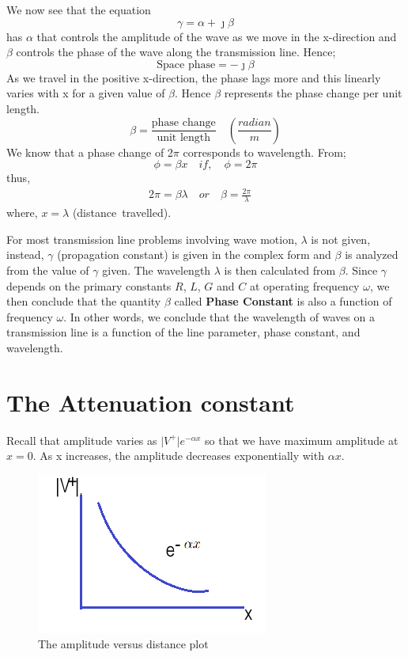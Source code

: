 We now see that the equation 
\begin{equation}
\gamma = \alpha + \jmath\beta 
\end{equation}
has $\alpha$ that controls the amplitude of the wave as we move in the x-direction and $\beta$ controls the phase of the wave along the transmission line. Hence;
\begin{equation}
\text{Space phase} = -\jmath\beta
\end{equation}
As we travel in the positive x-direction, the phase lags more and this linearly varies with x for a given value of $\beta$. Hence $\beta$ represents the phase change per unit length.
\begin{equation}
\beta = \frac{\text{phase change}}{\text{unit length}} \quad\left(\frac{radian}{m}\right)
\end{equation}
We know that a phase change of 2$\pi$ corresponds to wavelength. From;
\begin{equation}
\phi = \beta x \quad if,  \quad\phi = 2\pi
\end{equation}
thus,
\begin{align*}
2\pi = \beta\lambda \quad or \quad\beta = \frac{2\pi}{\lambda} \quad
\end{align*}
where, $ x = \lambda $ (distance\ travelled).

For most transmission line problems involving wave motion, $\lambda$ is not given, instead, $\gamma$ (propagation constant) is given in the complex form and $\beta$ is analyzed from the value of $\gamma$ given. The wavelength $\lambda$ is then calculated from $\beta$.
Since $\gamma$ depends on the primary constants $R$, $L$, $G$ and $C$ at operating frequency $\omega$, we then conclude that the quantity $\beta$ called \textbf{Phase Constant} is also a function of frequency $\omega$. In other words, we conclude that the wavelength of waves on a transmission line is a function of the line parameter, phase constant, and wavelength.
\section{The Attenuation constant}
Recall that amplitude varies as $\lvert V^+ \rvert e^{-\alpha x}$ so that we have maximum amplitude at $x = 0$. As x increases, the amplitude decreases exponentially with $\alpha x$. 
\begin{figure}[h]
\centering
\includegraphics[scale = 0.45]{./graphics/VversusXcurve}
\caption{The amplitude versus distance plot}
\label{fig:VversusXcurve}
\end{figure}

